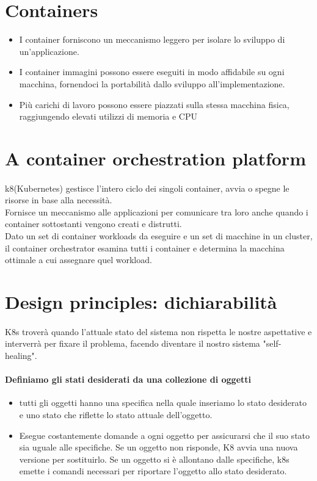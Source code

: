 \documentclass[a4paper, 12pt]{report}
\begin{document}
        \section{Containers}
        \begin{itemize}
          \item I container forniscono un meccanismo leggero per isolare lo sviluppo di un'applicazione. 
          \item I container immagini possono essere eseguiti in modo affidabile su ogni macchina, fornendoci la portabilità dallo sviluppo all'implementazione.
          \item Più carichi di lavoro possono essere piazzati sulla stessa macchina fisica, raggiungendo elevati utilizzi di memoria e CPU
        \end{itemize}
        \section{A container orchestration platform}
          \paragraph{} k8(Kubernetes) gestisce l'intero ciclo dei singoli container, avvia o spegne le risorse in base alla necessità.\\
          Fornisce un meccanismo alle applicazioni per comunicare tra loro anche quando i container sottostanti vengono creati e distrutti.\\
          Dato un set di container workloads da eseguire e un set di macchine in un cluster, il container orchestrator esamina tutti i container e determina la macchina ottimale a cui assegnare quel workload.       
        \clearpage
          \section{Design principles: dichiarabilità}
          \paragraph{} K8s troverà quando l'attuale stato del sistema non rispetta le nostre aspettative e interverrà per fixare il problema, facendo diventare il nostro sistema "self-healing".
          \paragraph{Definiamo gli stati desiderati da una collezione di oggetti}
          \begin{itemize}
            \item tutti gli oggetti hanno una specifica nella quale inseriamo lo stato desiderato e uno stato che riflette lo stato attuale dell'oggetto.
            \item Esegue costantemente domande a ogni oggetto per assicurarsi che il suo stato sia uguale alle specifiche.
            \subitem{$\circ$} Se un oggetto non risponde, K8 avvia una nuova versione per sostituirlo.
            \subitem{$\circ$} Se un oggetto si è allontano dalle specifiche, k8s emette i comandi necessari per riportare l'oggetto allo stato desiderato.
          \end{itemize}
\end{document}
